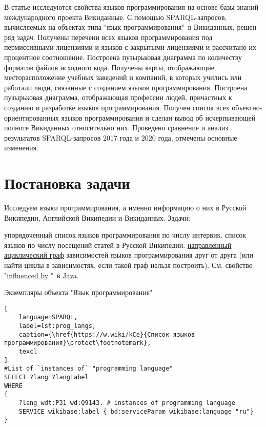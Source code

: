 В статье исследуются свойства языков программирования на основе базы знаний международного проекта Викиданные. С помощью SPARQL-запросов, вычисляемых на объектах типа "язык программирования"\  в Викиданных, решен ряд задач. Получены перечени всех языков программирования под пермиссивными лицензиями и языков с закрытыми лицензиями и рассчитано их процентное соотношение. Построена пузырьковая диаграмма по количеству форматов файлов исходного кода. Получены карты, отображающие месторасположение учебных заведений и компаний, в которых учились или работали люди, связанные с созданием языков программирования. Построена пузырьковая диаграмма, отображающая профессии людей, причастных к созданию и разработке языков программирования. Получен список всех объектно-ориентированных языков программирования и сделан вывод об исчерпывающей полноте Викиданных относительно них. Проведено сравнение и анализ результатов SPARQL-запросов 2017 года и 2020 года, отмечены основные изменения. 

\section{Постановка задачи}
Исследуем языки программирования, а именно информацию о них в Русской Википедии, Английской Википедии и Викиданных.
Задачи:
\begin{enumerate} 
   упорядоченный список языков программирования по числу интервик.
   список языков по числу посещений статей в Русской Википедии.
   \href{https://en.wikipedia.org/wiki/Directed_acyclic_graph}{направленный ациклический граф} зависимостей языков программирования друг от друга (или найти циклы в зависимостях, если такой граф нельзя построить). См. свойство "\href{https://www.wikidata.org/wiki/Property:P737}{influenced by}
"\  в \href{https://www.wikidata.org/wiki/Q251}{Java}.
\end{enumerate}

Экземпляры объекта "Язык программирования"

\begin{lstlisting}[
	language=SPARQL,
	label=lst:prog_langs,
	caption={\href{https://w.wiki/kCe}{Список языков программирования}\protect\footnotemark},
	texcl 
]
#List of `instances of` "programming language" 
SELECT ?lang ?langLabel
WHERE
{
    ?lang wdt:P31 wd:Q9143. # instances of programming language
    SERVICE wikibase:label { bd:serviceParam wikibase:language "ru"}
}
\end{lstlisting}


